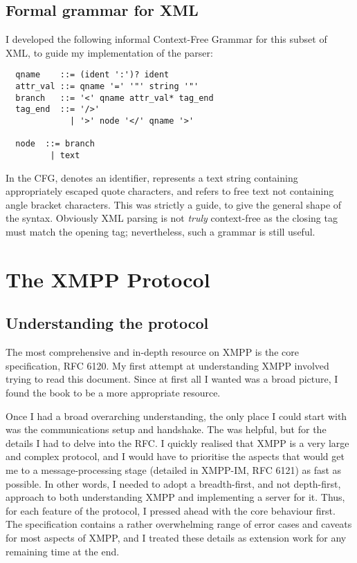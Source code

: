 \subsection{Formal grammar for XML}
I developed the following informal Context-Free Grammar for this subset of XML, to guide my implementation of the parser:

\hspace*{-\parindent}%
\begin{minipage}{\linewidth}
  \begin{lstlisting}
  qname    ::= (ident ':')? ident
  attr_val ::= qname '=' '"' string '"'
  branch   ::= '<' qname attr_val* tag_end
  tag_end  ::= '/>'
             | '>' node '</' qname '>'

  node  ::= branch
         | text

  \end{lstlisting}
\end{minipage}

In the CFG,  denotes an identifier,  represents a text string containing appropriately escaped quote characters, and  refers to free text not containing angle bracket characters. This was strictly a guide, to give the general shape of the syntax. Obviously XML parsing is not \emph{truly} context-free as the closing tag must match the opening tag; nevertheless, such a grammar is still useful.

\section{The XMPP Protocol}

\subsection{Understanding the protocol}
The most comprehensive and in-depth resource on XMPP is the core specification, RFC 6120. My first attempt at understanding XMPP involved trying to read this document. Since at first all I wanted was a broad picture, I found the book  to be a more appropriate resource.

Once I had a broad overarching understanding, the only place I could start with was the communications setup and handshake. The  was helpful, but for the details I had to delve into the RFC. I quickly realised that XMPP is a very large and complex protocol, and I would have to prioritise the aspects that would get me to a message-processing stage (detailed in XMPP-IM, RFC 6121) as fast as possible. In other words, I needed to adopt a breadth-first, and not depth-first, approach to both understanding XMPP and implementing a server for it. Thus, for each feature of the protocol, I pressed ahead with the core behaviour first. The specification contains a rather overwhelming range of error cases and caveats for most aspects of XMPP, and I treated these details as extension work for any remaining time at the end.

